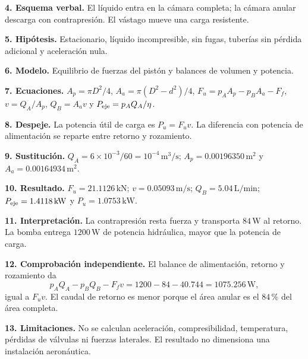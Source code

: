 \textbf{4. Esquema verbal.} El líquido entra en la cámara completa; la cámara anular descarga con contrapresión. El vástago mueve una carga resistente.

\textbf{5. Hipótesis.} Estacionario, líquido incompresible, sin fugas, tuberías sin pérdida adicional y aceleración nula.

\textbf{6. Modelo.} Equilibrio de fuerzas del pistón y balances de volumen y potencia.

\textbf{7. Ecuaciones.} $A_p=\pi D^2/4$, $A_a=\pi(D^2-d^2)/4$, $F_u=p_AA_p-p_BA_a-F_f$, $v=Q_A/A_p$, $Q_B=A_av$ y $P_{\rm eje}=p_AQ_A/\eta$.

\textbf{8. Despeje.} La potencia útil de carga es $P_u=F_uv$. La diferencia con potencia de alimentación se reparte entre retorno y rozamiento.

\textbf{9. Sustitución.} $Q_A=6\times10^{-3}/60=10^{-4}\,\mathrm{m^3/s}$; $A_p=0.00196350\,\mathrm{m^2}$ y $A_a=0.00164934\,\mathrm{m^2}$.

\textbf{10. Resultado.} $F_u=21.1126\,\mathrm{kN}$; $v=0.05093\,\mathrm{m/s}$; $Q_B=5.04\,\mathrm{L/min}$; $P_{\rm eje}=1.4118\,\mathrm{kW}$ y $P_u=1.0753\,\mathrm{kW}$.

\textbf{11. Interpretación.} La contrapresión resta fuerza y transporta $84\,\mathrm{W}$ al retorno. La bomba entrega $1200\,\mathrm{W}$ de potencia hidráulica, mayor que la potencia de carga.

\textbf{12. Comprobación independiente.} El balance de alimentación, retorno y rozamiento da
\begin{equation}
 p_AQ_A-p_BQ_B-F_fv=1200-84-40.744=1075.256\,\mathrm{W},
\end{equation}
igual a $F_uv$. El caudal de retorno es menor porque el área anular es el $84\,\text{\%}$ del área completa.

\textbf{13. Limitaciones.} No se calculan aceleración, compresibilidad, temperatura, pérdidas de válvulas ni fuerzas laterales. El resultado no dimensiona una instalación aeronáutica.

